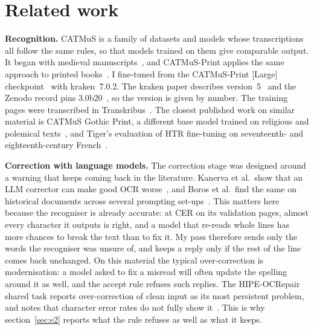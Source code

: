 \section{Related work}
\label{sec:related}

\textbf{Recognition.} CATMuS is a family of datasets and models whose
transcriptions all follow the same rules, so that models trained on them give
comparable output. It began with medieval
manuscripts~\cite{clerice2024catmusmedieval}, and CATMuS-Print applies the same
approach to printed books~\cite{gabay2024catmusprint}. I fine-tuned
from the CATMuS-Print [Large] checkpoint~\cite{gabay2024catmusprintlarge} with
kraken~7.0.2. The kraken paper describes version~5~\cite{kiessling2025kraken}
and the Zenodo record pins 3.0b20~\cite{kiessling2021krakensoftware}, so the
version is given by number. The training pages were transcribed in
Transkribus~\cite{kahle2017transkribus, muehlberger2019transkribus}. The
closest published work on similar material is CATMuS Gothic Print, a different
base model trained on religious and polemical texts~\cite{solfrini2024catmusgothic},
and Tiger's evaluation of HTR fine-tuning on seventeenth- and
eighteenth-century French~\cite{tiger2026overfit}.

\textbf{Correction with language models.} The correction stage was designed
around a warning that keeps coming back in the literature. Kanerva et al.\ show
that an LLM corrector can make good OCR worse~\cite{kanerva2025nofreelunches},
and Boros et al.\ find the same on historical documents across several
prompting set-ups~\cite{boros2024postcorrection}. This matters here because the
recogniser is already accurate: at \trainCer{} CER on its validation pages,
almost every character it outputs is right, and a model that re-reads whole
lines has more chances to break the text than to fix it. My pass therefore
sends only the words the recogniser was unsure of, and keeps a reply only if
the rest of the line comes back unchanged. On this material the typical
over-correction is modernisation: a model asked to fix a misread  will
often update the spelling around it as well, and the accept rule refuses such
replies. The HIPE-OCRepair shared task reports over-correction of clean input
as its most persistent problem, and notes that character error rates do not
fully show it~\cite{ehrmann2026hipeocrepair}. This is why
section~\ref{sec:e2} reports what the rule refuses as well as what it keeps.

